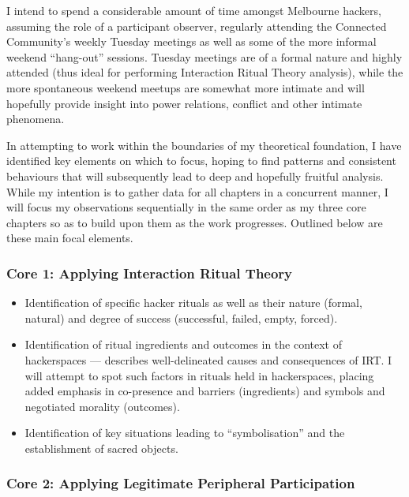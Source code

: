 I intend to spend a considerable amount of time amongst Melbourne hackers, assuming the role of a participant observer, regularly attending the Connected Community's weekly Tuesday meetings as well as some of the more informal weekend ``hang-out'' sessions. Tuesday meetings are of a formal nature and highly attended (thus ideal for performing Interaction Ritual Theory analysis), while the more spontaneous weekend meetups are somewhat more intimate and will hopefully provide insight into power relations, conflict and other intimate phenomena.

In attempting to work within the boundaries of my theoretical foundation, I have identified key elements on which to focus, hoping to find patterns and consistent behaviours that will subsequently lead to deep and hopefully fruitful analysis. While my intention is to gather data for all chapters in a concurrent manner, I will focus my observations sequentially in the same order as my three core chapters so as to build upon them as the work progresses. Outlined below are these main focal elements.

\subsubsection{Core 1: Applying Interaction Ritual Theory}

\begin{itemize}
  \item Identification of specific hacker rituals as well as their nature (formal, natural) and degree of success (successful, failed, empty, forced).
  \item Identification of ritual ingredients and outcomes in the context of hackerspaces --- \citet[p.41]{collins04} describes well-delineated causes and consequences of IRT. I will attempt to spot such factors in rituals held in hackerspaces, placing added emphasis in co-presence and barriers (ingredients) and symbols and negotiated morality (outcomes).
  \item Identification of key situations leading to ``symbolisation'' and the establishment of sacred objects.
\end{itemize}

\subsubsection{Core 2: Applying Legitimate Peripheral Participation}

